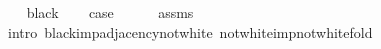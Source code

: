 \begin{isabellebody}
\isamarkupfalse%
\isanewline
\ \ \isamarkupfalse%
\ black\isanewline
\ \ \isamarkupfalse%
\ {\isacharquery}{\kern0pt}case\isanewline
\ \ \ \ \isamarkupfalse%
\ assms{\isacharparenleft}{\kern0pt}{}{\isacharparenright}{\kern0pt}\isanewline
\ \ \ \ \isamarkupfalse%
\ {\isacharparenleft}{\kern0pt}intro\ black{\isacharunderscore}{\kern0pt}imp{\isacharunderscore}{\kern0pt}adjacency{\isacharunderscore}{\kern0pt}not{\isacharunderscore}{\kern0pt}white\ not{\isacharunderscore}{\kern0pt}white{\isacharunderscore}{\kern0pt}imp{\isacharunderscore}{\kern0pt}not{\isacharunderscore}{\kern0pt}white{\isacharunderscore}{\kern0pt}fold{\isacharparenright}{\kern0pt}\isanewline
{}\isamarkupfalse%
%
\endisatagproof
{\isafoldproof}%
%
\isadelimproof
%
\endisadelimproof
%
\begin{isamarkuptext}%

\end{isamarkuptext}
\end{isabellebody}
